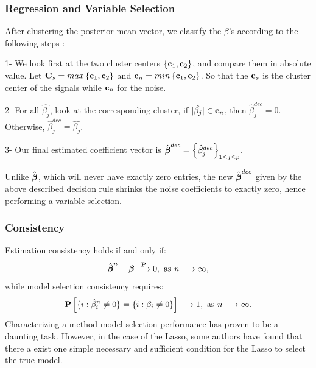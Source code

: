 \documentclass[10pt]{beamer}
\theoremstyle{plain}
\begin{document}
\begin{frame}
	\frametitle{Regression and Variable Selection}
	After clustering the posterior mean vector, we classify the $\beta$'s according to the following steps : 
	
\ben
\item[1-] We look first at the two cluster centers $\left\lbrace {\bf c}_1 , {\bf c}_2 \right\rbrace $, and compare them in absolute value. Let ${\bf C}_s = max\left\lbrace {\bf c}_1 , {\bf c}_2 \right\rbrace$ and ${\bf c}_n = min\left\lbrace {\bf c}_1 , {\bf c}_2 \right\rbrace$. So that the ${\bf c}_s$ is the cluster center of the signals while ${\bf c}_n$ for the noise.
\item[2-] For all $\hat{\beta_j}$, look at the corresponding cluster, if $\lvert\hat{\beta_j}\rvert \in {\bf c}_n $, then $\hat{\beta}_j^{dec}= 0$. Otherwise, $\hat{\beta}_j^{dec} = \hat{\beta_j}$.
\item[3-] Our final estimated coefficient vector is $\hat{\boldsymbol{\beta}}^{dec} = \left\lbrace \hat{\beta}^{dec}_{j} \right\rbrace_{1\leq j \leq p}$.
\een

Unlike $\hat{\boldsymbol{\beta}}$, which will never have exactly zero entries, the new $\hat{\boldsymbol{\beta}}^{dec}$ given by the above described decision rule shrinks the noise coefficients to exactly zero, hence performing a variable selection.
\end{frame}

\begin{frame}
	\frametitle{Consistency}
	Estimation consistency holds if and only if:\[ \hat{\boldsymbol{\beta}}^{n} -  \boldsymbol{\beta} \stackrel{{\bf P}}{\longrightarrow}0, \ \text{as } n\longrightarrow \infty,  \]
while model selection consistency requires:
\[ \P\left[ \lbrace i : \hat{\beta}_i^{n} \neq 0 \rbrace = \lbrace i : \beta_i \neq 0\rbrace \right] \longrightarrow 1, \ \text{as } n\longrightarrow \infty. \]
Characterizing a method model selection performance has proven to be a daunting task. However, in the case of the Lasso, some authors have found that there a exist one simple necessary and sufficient condition for the Lasso to select the true model.

\end{frame}
\end{document}
